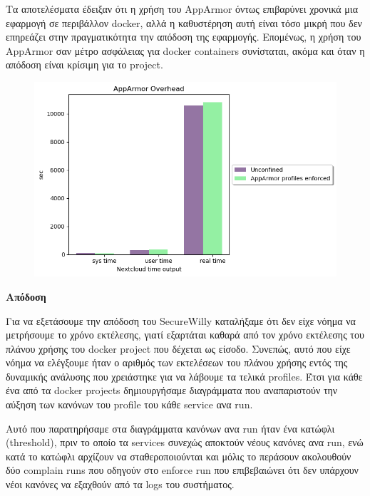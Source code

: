 Τα αποτελέσματα έδειξαν ότι η χρήση του \en AppArmor\gr{} όντως επιβαρύνει χρονικά μια εφαρμογή σε περιβάλλον \en docker\gr{}, αλλά η καθυστέρηση αυτή είναι τόσο μικρή που δεν επηρεάζει στην πραγματικότητα την απόδοση της εφαρμογής. Επομένως, η χρήση του \en AppArmor\gr{} σαν μέτρο ασφάλειας για \en docker containers\gr{} συνίσταται, ακόμα και όταν η απόδοση είναι κρίσιμη για το \en project\gr{}.
\clearpage
\begin{figure}[h!]
  \centering
   \includegraphics[width=1\linewidth]{figures/overhead.png}
\end{figure}

\hfill\break
\textbf{Απόδοση}
\hfill\break

Για να εξετάσουμε την απόδοση του \en SecureWilly\gr{} καταλήξαμε ότι δεν είχε νόημα να μετρήσουμε το χρόνο εκτέλεσης, γιατί εξαρτάται καθαρά από τον χρόνο εκτέλεσης του πλάνου χρήσης του \en docker project\gr{} που δέχεται ως είσοδο. Συνεπώς, αυτό που είχε νόημα να ελέγξουμε ήταν ο αριθμός των εκτελέσεων του πλάνου χρήσης εντός της δυναμικής ανάλυσης που χρειάστηκε για να λάβουμε τα τελικά \en profiles\gr{}. Έτσι για κάθε ένα από τα \en docker projects\gr{} δημιουργήσαμε διαγράμματα που αναπαριστούν την αύξηση των κανόνων του \en profile\gr{} του κάθε \en service\gr{} ανα \en run\gr{}.

Αυτό που παρατηρήσαμε στα διαγράμματα κανόνων ανα \en run\gr{} ήταν ένα κατώφλι (\en threshold\gr{}), πριν το οποίο τα \en services\gr{} συνεχώς αποκτούν νέους κανόνες ανα \en run\gr{}, ενώ κατά το κατώφλι αρχίζουν να σταθεροποιούνται και μόλις το περάσουν ακολουθούν δύο \en complain runs\gr{} που οδηγούν στο \en enforce run\gr{} που επιβεβαιώνει ότι δεν υπάρχουν νέοι κανόνες να εξαχθούν από τα \en logs\gr{} του συστήματος.

